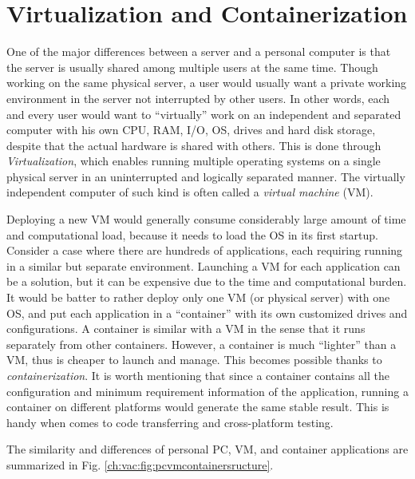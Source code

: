 \chapter{Virtualization and Containerization}

One of the major differences between a server and a personal computer is that the server is usually shared among multiple users at the same time. Though working on the same physical server, a user would usually want a private working environment in the server not interrupted by other users. In other words, each and every user would want to ``virtually'' work on an independent and separated computer with his own CPU, RAM, I/O, OS, drives and hard disk storage, despite that the actual hardware is shared with others. This is done through \textit{Virtualization}, which enables running multiple operating systems on a single physical server in an uninterrupted and logically separated manner. The virtually independent computer of such kind is often called a \textit{virtual machine} (VM).

Deploying a new VM would generally consume considerably large amount of time and computational load, because it needs to load the OS in its first startup. Consider a case where there are hundreds of applications, each requiring running in a similar but separate environment. Launching a VM for each application can be a solution, but it can be expensive due to the time and computational burden. It would be batter to rather deploy only one VM (or physical server) with one OS, and put each application in a ``container'' with its own customized drives and configurations. A container is similar with a VM in the sense that it runs separately from other containers. However, a container is much ``lighter'' than a VM, thus is cheaper to launch and manage. This becomes possible thanks to \textit{containerization}. It is worth mentioning that since a container contains all the configuration and minimum requirement information of the application, running a container on different platforms would generate the same stable result. This is handy when comes to code transferring and cross-platform testing.

The similarity and differences of personal PC, VM, and container applications are summarized in Fig. \ref{ch:vac:fig:pcvmcontainersructure}.

